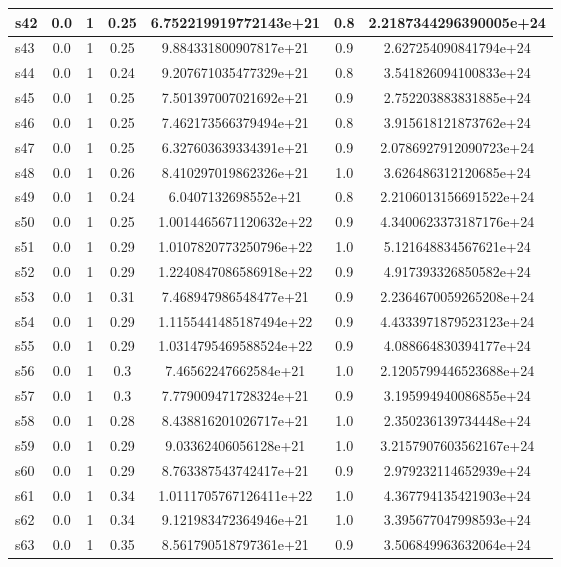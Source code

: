 \documentclass{article}
\begin{document}
\begin{tabular}{|l|c|c|c|c|c|c|}
s42 &0.0 & 1 & 0.25 & 6.752219919772143e+21 & 0.8 & 2.2187344296390005e+24\\
\hline
s43 &0.0 & 1 & 0.25 & 9.884331800907817e+21 & 0.9 & 2.627254090841794e+24\\
\hline
s44 &0.0 & 1 & 0.24 & 9.207671035477329e+21 & 0.8 & 3.541826094100833e+24\\
\hline
s45 &0.0 & 1 & 0.25 & 7.501397007021692e+21 & 0.9 & 2.752203883831885e+24\\
\hline
s46 &0.0 & 1 & 0.25 & 7.462173566379494e+21 & 0.8 & 3.915618121873762e+24\\
\hline
s47 &0.0 & 1 & 0.25 & 6.327603639334391e+21 & 0.9 & 2.0786927912090723e+24\\
\hline
s48 &0.0 & 1 & 0.26 & 8.410297019862326e+21 & 1.0 & 3.626486312120685e+24\\
\hline
s49 &0.0 & 1 & 0.24 & 6.0407132698552e+21 & 0.8 & 2.2106013156691522e+24\\
\hline
s50 &0.0 & 1 & 0.25 & 1.0014465671120632e+22 & 0.9 & 4.3400623373187176e+24\\
\hline
s51 &0.0 & 1 & 0.29 & 1.0107820773250796e+22 & 1.0 & 5.121648834567621e+24\\
\hline
s52 &0.0 & 1 & 0.29 & 1.2240847086586918e+22 & 0.9 & 4.917393326850582e+24\\
\hline
s53 &0.0 & 1 & 0.31 & 7.468947986548477e+21 & 0.9 & 2.2364670059265208e+24\\
\hline
s54 &0.0 & 1 & 0.29 & 1.1155441485187494e+22 & 0.9 & 4.4333971879523123e+24\\
\hline
s55 &0.0 & 1 & 0.29 & 1.0314795469588524e+22 & 0.9 & 4.088664830394177e+24\\
\hline
s56 &0.0 & 1 & 0.3 & 7.46562247662584e+21 & 1.0 & 2.1205799446523688e+24\\
\hline
s57 &0.0 & 1 & 0.3 & 7.779009471728324e+21 & 0.9 & 3.195994940086855e+24\\
\hline
s58 &0.0 & 1 & 0.28 & 8.438816201026717e+21 & 1.0 & 2.350236139734448e+24\\
\hline
s59 &0.0 & 1 & 0.29 & 9.03362406056128e+21 & 1.0 & 3.2157907603562167e+24\\
\hline
s60 &0.0 & 1 & 0.29 & 8.763387543742417e+21 & 0.9 & 2.979232114652939e+24\\
\hline
s61 &0.0 & 1 & 0.34 & 1.0111705767126411e+22 & 1.0 & 4.367794135421903e+24\\
\hline
s62 &0.0 & 1 & 0.34 & 9.121983472364946e+21 & 1.0 & 3.395677047998593e+24\\
\hline
s63 &0.0 & 1 & 0.35 & 8.561790518797361e+21 & 0.9 & 3.506849963632064e+24\\

\end{tabular}
\end{document}
